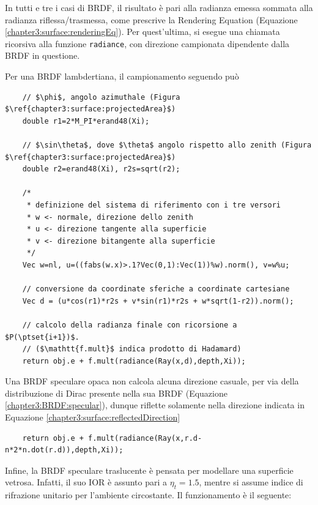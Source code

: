 In tutti e tre i casi di BRDF, il risultato \`e pari alla radianza emessa sommata alla radianza riflessa/trasmessa, come prescrive 
la Rendering Equation (Equazione \ref{chapter3:surface:renderingEq}). Per quest'ultima, si esegue una chiamata ricorsiva alla funzione 
\texttt{radiance}, con direzione campionata dipendente dalla BRDF in questione.\par
Per una BRDF lambdertiana, il campionamento seguendo pu\`o 
\begin{verbatim}
	// $\phi$, angolo azimuthale (Figura $\ref{chapter3:surface:projectedArea}$)
	double r1=2*M_PI*erand48(Xi);

	// $\sin\theta$, dove $\theta$ angolo rispetto allo zenith (Figura $\ref{chapter3:surface:projectedArea}$)
	double r2=erand48(Xi), r2s=sqrt(r2);

	/*
	 * definizione del sistema di riferimento con i tre versori
	 * w <- normale, direzione dello zenith
	 * u <- direzione tangente alla superficie
	 * v <- direzione bitangente alla superficie
	 */
	Vec w=nl, u=((fabs(w.x)>.1?Vec(0,1):Vec(1))%w).norm(), v=w%u;

	// conversione da coordinate sferiche a coordinate cartesiane
	Vec d = (u*cos(r1)*r2s + v*sin(r1)*r2s + w*sqrt(1-r2)).norm();

	// calcolo della radianza finale con ricorsione a $P(\ptset{i+1})$.
	// ($\mathtt{f.mult}$ indica prodotto di Hadamard)
	return obj.e + f.mult(radiance(Ray(x,d),depth,Xi));
\end{verbatim}
Una BRDF speculare opaca non calcola alcuna direzione casuale, per via della distribuzione di Dirac presente nella sua BRDF 
(Equazione \ref{chapter3:BRDF:specular}), dunque riflette solamente nella direzione indicata in Equazione \ref{chapter3:surface:reflectedDirection}
\begin{verbatim}
	return obj.e + f.mult(radiance(Ray(x,r.d-n*2*n.dot(r.d)),depth,Xi));
\end{verbatim}
Infine, la BRDF speculare traslucente \`e pensata per modellare una superficie vetrosa. Infatti, il suo IOR \`e assunto pari a $\eta_t=1.5$, mentre 
si assume indice di rifrazione unitario per l'ambiente circostante. Il funzionamento \`e il seguente:
